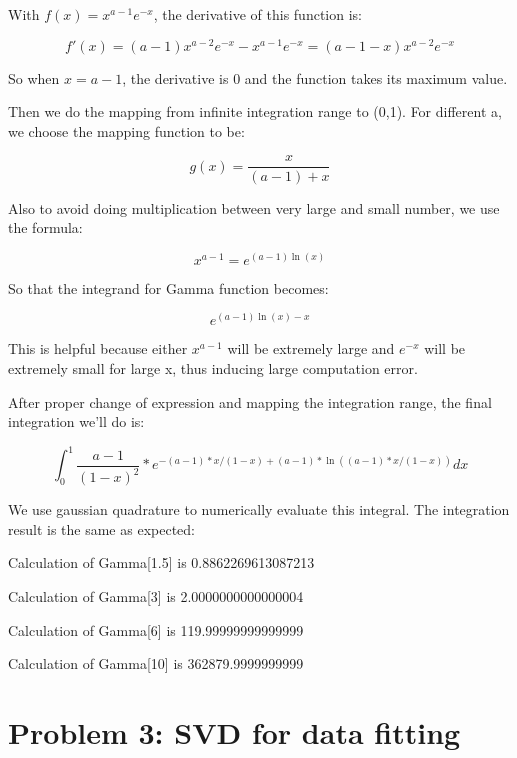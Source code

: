 \documentclass[letterpaper,12pt]{article}
\begin{document}
\newpage

With $f(x) = x^{a-1} e^{-x}$, the derivative of this function is:

\begin{equation}
    f'(x) = (a-1) x^{a-2} e^{-x} - x^{a-1} e^{-x} = (a-1 - x) x^{a-2} e^{-x}
\end{equation}

So when $x = a-1$, the derivative is 0 and the function takes its maximum value.

Then we do the mapping from infinite integration range to (0,1). For different a, we choose the mapping function to be:

\begin{equation}
    g(x) = \frac{x}{(a-1) + x}
\end{equation}

Also to avoid doing multiplication between very large and small number, we use the formula:

\begin{equation}
    x^{a-1} = e^{(a-1)\ln(x)}
\end{equation}

So that the integrand for Gamma function becomes:

\begin{equation}
    e^{(a-1)\ln(x) - x}
\end{equation}

This is helpful because either $ x^{a-1}$ will be extremely large and $e^{-x}$ will be extremely small for large x, thus inducing large computation error.

After proper change of expression and mapping the integration range, the final integration we'll do is:

\begin{equation}
    \int_{0}^{1} \frac{a-1}{(1-x)^2} * e^{-(a-1)*x/(1-x) + (a-1)*\ln((a-1)*x/(1-x))} dx
\end{equation}

We use gaussian quadrature to numerically evaluate this integral. The integration result is the same as expected:

Calculation of Gamma[1.5] is 0.8862269613087213

Calculation of Gamma[3] is 2.0000000000000004

Calculation of Gamma[6] is 119.99999999999999

Calculation of Gamma[10] is 362879.9999999999



\section{Problem 3: SVD for data fitting}
\end{document}
